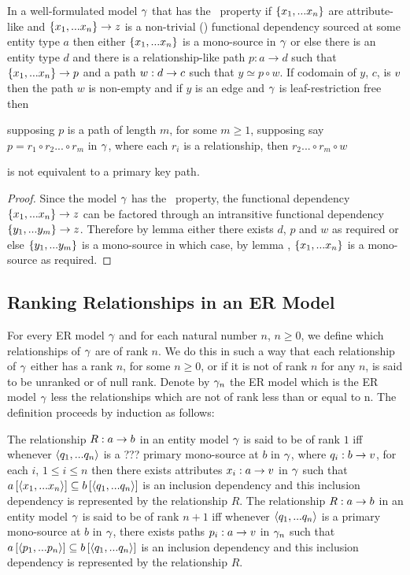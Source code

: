 \begin{lemma}
In a well-formulated model $\gamma$ that has the \fdfactoring\ property if $\left\{x_1,...x_n\right\}$ are attribute-like and
$\left\{x_1,...x_n\right\} \rightarrow z$ is a non-trivial () functional dependency sourced
at some entity type $a$ then either $\left\{x_1,...x_n\right\}$ is a mono-source in $\gamma$
or else there is an entity type $d$ and there is a
relationship-like path $p:a \rightarrow d$ such that $\left\{x_1,...x_n\right\} \rightarrow p$ and a  path $w:d \rightarrow c$  such that $y \simeq p \circ w$. 
If codomain of $y$, $c$, is $v$ then
the path $w$ is non-empty and if $y$ is an edge and $\gamma$ is leaf-restriction free then 
\begin{newtt} supposing $p$ is a path of length $m$, for some $m \geq 1$, supposing say $ p = r_1 \circ r_2 ... \circ r_m$ 
 in $\gamma$,   where each $r_i$ is a relationship, then $r_2 ... \circ r_m \circ w$
\end{newtt}
is not equivalent to a primary key path.
\end{lemma}
\begin{proof}
Since the model $\gamma$  has the \fdfactoring\ property, the functional dependency $\left\{x_1,...x_n\right\} \rightarrow z$ can be factored through an intransitive functional 
dependency $\left\{y_1,...y_m\right\} \rightarrow z$. Therefore by lemma  either there exists $d$, $p$ and $w$ as required
or else  $\left\{y_1,...y_m\right\}$ is a mono-source in which case, by lemma , $\left\{x_1,...x_n\right\}$ is a mono-source as required.
\end{proof}

\subsection{Ranking Relationships in an ER Model}
For every ER model $\gamma$ and for each natural number $n$, $n \geq 0$, we define which relationships of
$\gamma$ are of rank $n$. We do this  in such a way that each relationship of $\gamma$ either has a rank $n$, for some $n \geq 0$, or if it is not of rank 
$n$ for any $n$, is said to be unranked or of null rank. Denote by $\gamma_n$ the ER model which is the ER model 
$\gamma$ less the relationships which are not of rank less than or equal to n. The definition proceeds by induction as follows:
\begin{definition}
The relationship $R: a \rightarrow b$ in an entity model $\gamma$ is said to be of rank $1$ iff whenever 
$\langle q_1,...q_n\rangle$ is a  ??? primary mono-source at $b$ in $\gamma$, where $q_i:b \rightarrow v$, for each $i$, $1 \leq i \leq n$  then there exists attributes $x_i:a \rightarrow v$ in $\gamma$ such that $a\left[\langle x_1,...x_n\rangle\right]\subseteq b\left[\langle q_1,...q_n\rangle\right]$ is an inclusion dependency and this inclusion dependency is represented by the relationship $R$. 
The relationship $R: a \rightarrow b$ in an entity model $\gamma$ is said to be of rank $n+1$ iff whenever 
$\langle q_1,...q_n\rangle$ is a primary mono-source at $b$ in $\gamma$, there exists paths $p_i:a \rightarrow v$ in $\gamma_n$ such that $a\left[\langle p_1,...p_n\rangle\right]\subseteq b\left[\langle q_1,...q_n\rangle\right]$ is an inclusion dependency and this inclusion dependency  is represented by the relationship $R$. 
\end{definition}

